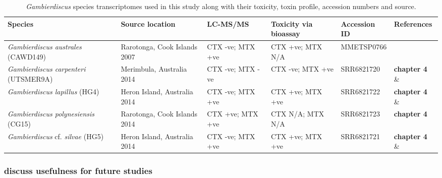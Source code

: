 \documentclass[12pt]{article}
\begin{document}
\begin{table}
\caption{\emph{Gambierdiscus} species transcriptomes used in this study along with their toxicity, toxin profile, accession numbers and source.}
\label{tbl:SeqTable}
\begin{tabular}{ | p{3cm} | p{2cm} | p{2.5cm} | p{2.5cm} | p{2cm} | p{2cm}|}
\hline
\textbf{Species} & \textbf{Source location}&\textbf{LC-MS/MS} & \textbf{Toxicity via bioassay} & \textbf{Accession ID} & \textbf{References} \\
\hline
\textit{Gambierdiscus australes} (CAWD149)&Rarotonga, Cook Islands 2007& CTX -ve; MTX +ve&CTX +ve; MTX N/A&MMETSP0766&\cite{keeling2014marine,rhodes2010toxic,munday2017ciguatoxins}\\
\hline
\textit{Gambierdiscus carpenteri} (UTSMER9A)&Merimbula, Australia 2014&CTX -ve; MTX -ve&CTX -ve; MTX +ve&SRR6821720
&\textbf{chapter 4} \& \cite{larsson2018toxicology}\\
\hline
\textit{Gambierdiscus lapillus} (HG4)&Heron Island, Australia 2014&CTX -ve; MTX +ve&CTX +ve; MTX +ve&SRR6821722
&\textbf{chapter 4} \& \cite{larsson2018toxicology,kretzschmar2017characterization}\\
\hline
\textit{Gambierdiscus polynesiensis} (CG15)&Rarotonga, Cook Islands 2014&CTX +ve; MTX +ve&CTX N/A; MTX N/A&SRR6821723
&\textbf{chapter 4} \\
\hline
\textit{Gambierdiscus} cf. \textit{silvae} (HG5)&Heron Island, Australia 2014&CTX -ve; MTX +ve&CTX +ve; MTX +ve&SRR6821721
&\textbf{chapter 4} \& \cite{larsson2018toxicology,kretzschmar2017characterization}\\
\hline
\end{tabular}
\end{table}
\FloatBarrier
\newpage


\subsubsection*{discuss usefulness for future studies}
\end{document}

